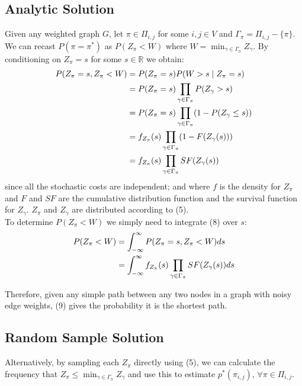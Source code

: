 \documentclass[twocolumn]{article}
\begin{document}
\subsection{Analytic Solution}
Given any weighted graph $G$, let $\pi \in \Pi_{i,j}$ for some $i,j \in V$ and $\Gamma_{\pi} = \Pi_{i,j}-\{\pi\}$. We can recast $P(\pi = \pi^{\ast})$ as $P(Z_{\pi}<W)$ where $W =  \min_{\gamma \in \Gamma_{\pi}} Z_{\gamma}$. By conditioning on $Z_{\pi}=s$ for some $s\in{{\mathbb R}}$ we obtain:
\begin{align}
P(Z_{\pi}=s, Z_{\pi}<W) & = P(Z_{\pi}=s)P(W>s \mid Z_{\pi}=s) \notag\\
& = P(Z_{\pi}=s)\prod_{\gamma \in \Gamma_{\pi}} P(Z_{\gamma}>s) \notag \\
& = P(Z_{\pi}=s)\prod_{\gamma \in \Gamma_{\pi}} (1-P(Z_{\gamma} \leq s)) \notag \\
& = f_{Z_{\pi}}(s)\prod_{\gamma \in \Gamma_{\pi}}(1-F(Z_{\gamma}(s))) \notag \\
& = f_{Z_{\pi}}(s)\prod_{\gamma \in \Gamma_{\pi}} SF(Z_{\gamma}(s))
\end{align}
since all the stochastic costs are independent; and where $f$ is the density for $ Z_{\pi}$ and $F$ and $SF$ are the cumulative distribution function and the  survival function for $Z_{\gamma}$.  $ Z_{\pi}$ and $Z_{\gamma}$ are distributed according to (5). \\

To determine $ P(Z_{\pi}<W)$ we simply need to integrate (8) over $s$:
\begin{align}
 P(Z_{\pi}<W) & = \int_{-\infty}^{\infty} P(Z_{\pi}=s, Z_{\pi}<W)  ds \notag \\
& = \int_{-\infty}^{\infty} f_{Z_{\pi}}(s)\prod_{\gamma \in \Gamma_{\pi}}SF(Z_{\gamma}(s))  ds
\end{align}

Therefore, given any simple path between any two nodes in a graph with noisy edge weights, (9) gives the probability it is the shortest path.


\subsection{Random Sample Solution}
Alternatively, by sampling each $Z_{\pi}$ directly using (5), we can calculate the frequency that $Z_{\pi}\leq\min_{\gamma \in \Gamma_{\pi}} Z_{\gamma}$ and use this to estimate  $p^{*}(\pi_{i,j})$, $ \forall \pi \in \Pi_{i,j}$.\\
\end{document}
